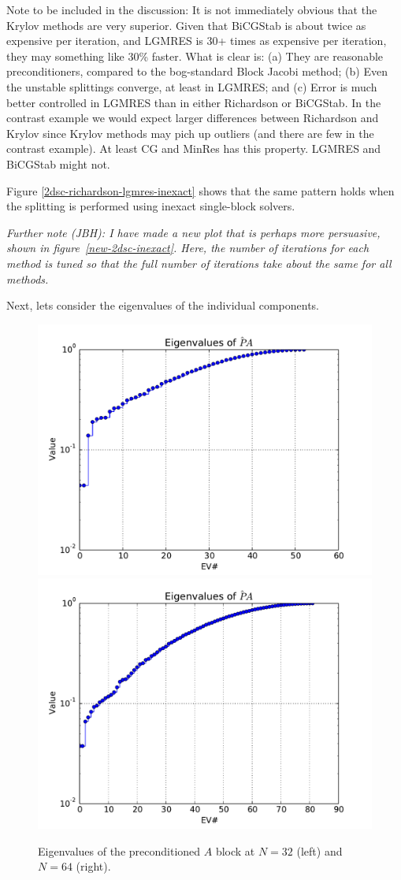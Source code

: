 \documentclass{article}
\begin{document}
Note to be included in the discussion: 
It is not immediately obvious that the Krylov methods are very
superior. Given that BiCGStab is about twice as expensive per iteration, and
LGMRES is 30+ times as expensive per iteration, they may something like 30\%
faster. What is clear is: (a) They are reasonable preconditioners, compared
to the bog-standard Block Jacobi method; (b) Even the unstable splittings
converge, at least in LGMRES; and (c) Error is much better controlled in
LGMRES than in either Richardson or BiCGStab. In the contrast example
we would expect larger differences between Richardson and Krylov since Krylov
methods may pich up outliers (and there are few in the contrast example). 
At least CG and MinRes has this property. LGMRES and BiCGStab might not. 

Figure \ref{2dsc-richardson-lgmres-inexact} shows that the same pattern holds
when the splitting is performed using inexact single-block solvers.

\emph{Further note (JBH): I have made a new plot that is perhaps more persuasive, shown in figure~\ref{new-2dsc-inexact}. Here, the number of iterations for each method is tuned so that the full number of iterations take about the same for all methods.}

Next, lets consider the eigenvalues of the individual components. 
\begin{figure}
\begin{center}
\includegraphics[width=.49\linewidth]{../EV[A],problem=2,exact=0,N=32.pdf}
\includegraphics[width=.49\linewidth]{../EV[A],problem=2,exact=0,N=64.pdf}
\caption{Eigenvalues of the preconditioned $A$ block at $N=32$ (left) and $N=64$ (right).}
\label{evA}
\end{center}
\end{figure}
\end{document}
